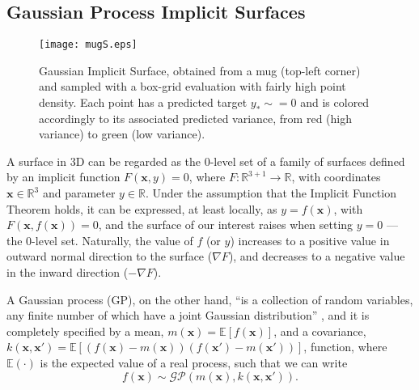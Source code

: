 
\subsection{Gaussian Process Implicit Surfaces}
\label{sec:gpis}
\begin{figure}[thb]
    \centering
    \texttt{[image: mugS.eps]}
    \caption{Gaussian Implicit Surface, obtained from a mug (top-left corner) and sampled with a box-grid evaluation with fairly high point density. Each point has a predicted target $y_* \sim= 0$ and is colored accordingly to its associated
    predicted variance, from red (high variance) to green (low variance).}
    \label{fig:gpmug}
\end{figure}

A surface in 3D can be regarded as the $0$-level set of a family of surfaces defined by an implicit function $F(\mathbf{x}, y)=0$, where $F:\mathbb{R}^{3+1}\rightarrow \mathbb{R}$, with coordinates $\mathbf{x}\in \mathbb{R}^3$ and parameter $y\in \mathbb{R}$.
 Under the assumption that the Implicit Function Theorem holds, it can be expressed, at least locally, as $y = f(\mathbf{x})$, with $F(\mathbf{x},f(\mathbf{x}))=0$, and the surface of our interest raises when setting $y = 0$ --- the $0$-level set. Naturally, the value of $f$ (or $y$) increases to a positive value in outward normal direction to the surface ($\nabla F$), and decreases to a negative value in the inward direction ($-\nabla F$).

A Gaussian process (GP), on the other hand, ``is a collection of random variables, any finite number of which have a joint Gaussian distribution'' \citep[Def. 2.1]{Rasmussen2006Gaussian}, and it is completely specified by a mean, $m(\mathbf{x}) = \mathbb{E}[f(\mathbf{x})]$, and a covariance, $k(\mathbf{x},\mathbf{x}') = \mathbb{E}[(f(\mathbf{x}) - m(\mathbf{x}))(f(\mathbf{x}') - m(\mathbf{x}'))]$, function, where $\mathbb{E}(\cdot)$ is the expected value of a real process, such that we can write
\begin{equation}
f(\mathbf{x}) \sim \mathcal{GP}(m(\mathbf{x}), k(\mathbf{x},\mathbf{x}')).
\end{equation}

